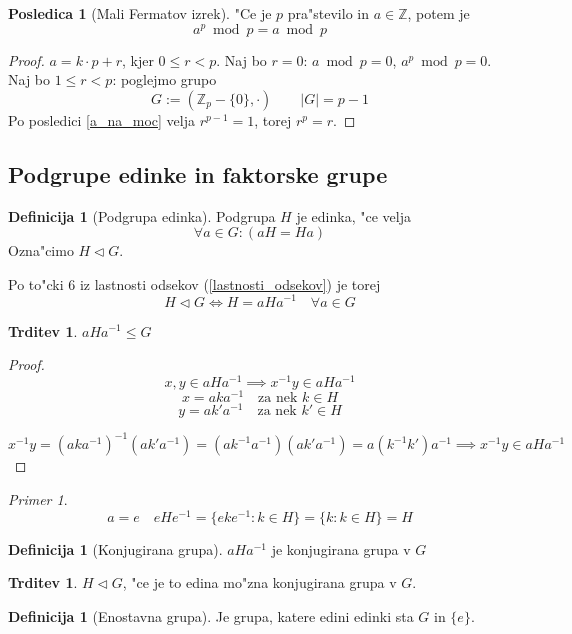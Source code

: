\documentclass[11pt, a4paper]{article}
\theoremstyle{definition}
\newtheorem{defn}[counter]{Definicija}
\newtheorem{conseq}[counter]{Posledica}
\newtheorem{claim}[counter]{Trditev}
\theoremstyle{remark}
\newtheorem*{ex}{Primer}
\newcommand{\Z}{\mathbb{Z}}
\begin{document}
	\begin{conseq}[Mali Fermatov izrek]
		"Ce je $p$ pra"stevilo in $a \in \Z$, potem je
		\[ a^p \bmod p = a \bmod p \]
	\end{conseq}
	\begin{proof}
		$a = k \cdot p + r$, kjer $0 \leq r < p$.
		Naj bo $r = 0$: $a \bmod p = 0$, $a^p \bmod p = 0$.
		Naj bo $1 \leq r < p$: poglejmo grupo
		\[ G := (\Z_p - \lbrace 0 \rbrace, \cdot) \qquad |G| = p-1 \]
		Po posledici \ref{a_na_moc} velja $r^{p-1} = 1$, torej $r^p = r$.
	\end{proof}

	\subsection{Podgrupe edinke in faktorske grupe}
	\begin{defn}[Podgrupa edinka]
		Podgrupa $H$ je edinka, "ce velja
		\[ \forall a \in G: (aH = Ha) \]
		Ozna"cimo $H \triangleleft G$.
	\end{defn}

	Po to"cki 6 iz lastnosti odsekov (\ref{lastnosti_odsekov}) je torej
	\[ H \triangleleft G \iff H = aHa^{-1} \quad \forall a \in G \]
	
	\begin{claim}
		$aHa^{-1} \leq G$
	\end{claim}
	\begin{proof}
		\[ x,y \in aHa^{-1} \implies x^{-1}y \in aHa^{-1} \]
		\[ x = aka^{-1} \quad \text{za nek }k \in H \]
		\[ y = ak'a^{-1} \quad \text{za nek }k' \in H \]
		
		\[x^{-1}y = (aka^{-1})^{-1}(ak'a^{-1}) = (ak^{-1}a^{-1})(ak'a^{-1}) = a(k^{-1}k')a^{-1} \implies x^{-1}y \in aHa^{-1} \]
	\end{proof}

	\begin{ex}
		\[a = e \quad eHe^{-1} = \lbrace eke^{-1}: k\in H \rbrace = \lbrace k: k \in H \rbrace = H \]
	\end{ex}
	
	\begin{defn}[Konjugirana grupa]
		$aHa^{-1}$ je konjugirana grupa v $G$
	\end{defn}
	\begin{claim}
		$H \triangleleft G$, "ce je to edina mo"zna konjugirana grupa v $G$.
	\end{claim}

	\begin{defn}[Enostavna grupa]
		Je grupa, katere edini edinki sta $G$ in $\lbrace e \rbrace$.
	\end{defn}
\end{document}
